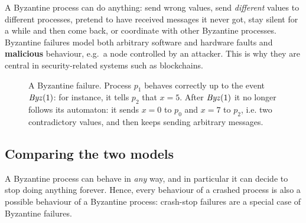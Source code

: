A Byzantine process can do anything: send wrong values, send \textit{different} values to different processes, pretend to have received messages it never got, stay silent for a while and then come back, or coordinate with other Byzantine processes. Byzantine failures model both arbitrary software and hardware faults and \textbf{malicious} behaviour, e.g.\ a node controlled by an attacker. This is why they are central in security-related systems such as blockchains.

\begin{figure}[H]
  \centering
  \caption{A Byzantine failure. Process $p_1$ behaves correctly up to the event $\mathit{Byz}(1)$: for instance, it tells $p_2$ that $x = 5$. After $\mathit{Byz}(1)$ it no longer follows its automaton: it sends $x = 0$ to $p_0$ and $x = 7$ to $p_2$, i.e. two contradictory values, and then keeps sending arbitrary messages.}
  \label{fig:byzantine}
\end{figure}

\subsection{Comparing the two models}

A Byzantine process can behave in \textit{any} way, and in particular it can decide to stop doing anything forever. Hence, every behaviour of a crashed process is also a possible behaviour of a Byzantine process: crash-stop failures are a special case of Byzantine failures.

